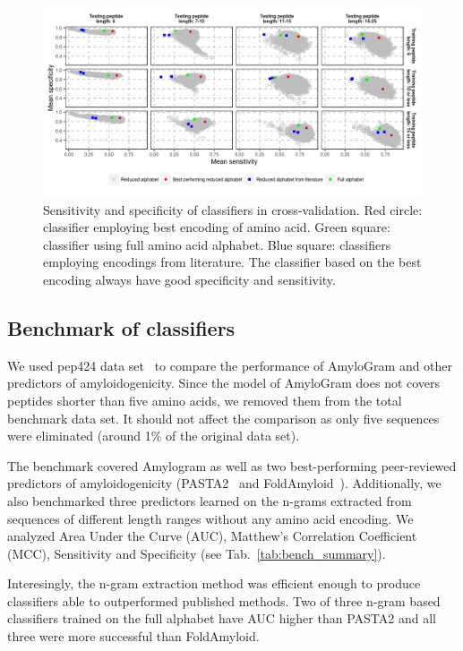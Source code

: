 \documentclass{bioinfo}
\begin{document}
\begin{figure}[!tpb]
\centerline{\includegraphics{figures/sesp_plot.png}}
\caption{Sensitivity and specificity of classifiers in cross-validation. Red circle: classifier employing best encoding of amino acid. Green square: classifier using full amino acid alphabet. Blue square: classifiers employing encodings from literature. The classifier based on the best encoding always have good specificity and sensitivity.}\label{fig:sesp_plot}
\end{figure}


\subsection{Benchmark of classifiers}

We used pep424 data set~\cite{walsh_pasta_2014} to compare the performance of 
AmyloGram and other predictors of amyloidogenicity. Since the model of AmyloGram 
does not covers peptides shorter than five amino acids, we removed them from the 
total benchmark data set. It should not affect the comparison as only five 
sequences were eliminated (around 1\% of the original data set).

  The benchmark covered Amylogram as well as two best-performing peer-reviewed 
predictors of amyloidogenicity (PASTA2~\citep{walsh_pasta_2014} and 
FoldAmyloid~\citep{garbuzynskiy_foldamyloid:_2010}). Additionally, we also 
benchmarked three predictors learned on the n-grams extracted from sequences of 
different length ranges without any amino acid encoding. We analyzed Area Under 
the Curve (AUC), Matthew's Correlation Coefficient (MCC), Sensitivity and 
Specificity (see Tab.~\ref{tab:bench_summary}).
    
  Interesingly, the n-gram extraction method was efficient enough to produce 
classifiers able to outperformed published methods. Two of three n-gram based 
classifiers trained on the full alphabet have AUC higher than PASTA2 and all 
three were more successful than FoldAmyloid.
    
\end{document}
